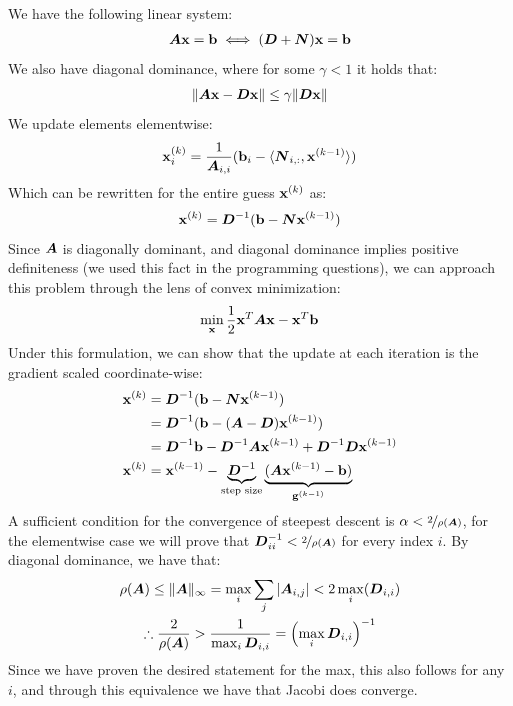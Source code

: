 \documentclass[]{exam}
\begin{document}
\begin{questions}
We have the following linear system:
\begin{gather*}
	\mA \vx = \vb \iff (\mD + \mN) \vx = \vb
\end{gather*}
We also have diagonal dominance, where for some $\gamma < 1$ it holds that:
\begin{gather*}
	\| \mA \vx - \mD \vx \| \leq \gamma \| \mD \vx \|
\end{gather*}
We update elements elementwise:
\begin{gather*}
	\vx^{(k)}_i = \frac{1}{\mA_{i,i}} (\vb_i - \langle \mN_{i, :}, \vx^{(k - 1)} \rangle)
\end{gather*}
Which can be rewritten for the entire guess $\vx^{(k)}$ as:
\begin{gather*}
	\vx^{(k)} = \mD^{-1} (\vb - \mN \vx^{(k - 1)})
\end{gather*}
% 
Since $\mA$ is diagonally dominant, and diagonal dominance implies positive definiteness (we used this fact in the programming questions), we can approach this problem through the lens of convex minimization:
\begin{gather*}
	\min_{\vx} \frac{1}{2} \vx^T \mA \vx - \vx^T \vb
\end{gather*}
Under this formulation, we can show that the update at each iteration is the gradient scaled coordinate-wise:
\begin{align*}
	\vx^{(k)} &= \mD^{-1} (\vb - \mN \vx^{(k - 1)}) \\
	&= \mD^{-1} (\vb - (\mA - \mD) \vx^{(k - 1)}) \\
	&= \mD^{-1} \vb - \mD^{-1} \mA \vx^{(k-1)} + \mD^{-1} \mD \vx^{(k - 1)} \\
	\vx^{(k)} &= \vx^{(k - 1)} - \underbrace{\mD^{-1}}_{\text{step size}} \underbrace{(\mA \vx^{(k-1)} - \vb)}_{\vg^{(k - 1)}}
\end{align*}
A sufficient condition for the convergence of steepest descent is $\alpha < \nicefrac{2}{\rho(\mA)}$, for the elementwise case we will prove that $\mD^{-1}_{ii} < \nicefrac{2}{\rho(\mA)}$ for every index $i$. By diagonal dominance, we have that:
\begin{gather*}
	\rho(\mA) \leq \| \mA \|_{\infty} = \max_{i} \sum_{j} |\mA_{i,j}| < 2 \max_{i}(\mD_{i,i}) \\
	\therefore \frac{2}{\rho(\mA)} > \frac{1}{\max_i \mD_{i,i}} = \left(\max_i \mD_{i,i}\right)^{-1} 
\end{gather*}
Since we have proven the desired statement for the max, this also follows for any $i$, and through this equivalence we have that Jacobi does converge.


\end{questions}
\end{document}
